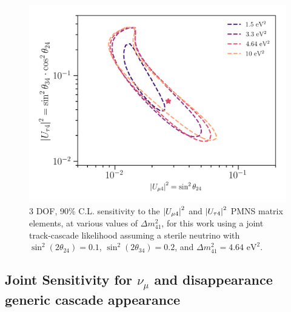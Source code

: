 \documentclass[main.tex]{subfiles}
\begin{document}
\begin{figure}
    \centering
    \includegraphics[width=0.99\linewidth]{figures/bananaplot.png}
    \caption{3 DOF, 90\% C.L. sensitivity to the $\left| U_{\mu 4} \right|^{2}$ and $\left| U_{\tau 4} \right|^{2}$ PMNS matrix elements, at various values of $\Delta m_{41}^{2}$, for this work using a joint track-cascade likelihood assuming a sterile neutrino with $\sin^{2}(2\theta_{24})=0.1$, $\sin^{2}(2\theta_{34})=0.2$, and $\Delta m_{41}^{2}=4.64\text{ eV}^{2}$.}\label{fig:jointsterile}
\end{figure}

\subsection{\label{sec:probebest} Joint Sensitivity for $\nu_\mu$ and disappearance generic cascade appearance}
\end{document}
